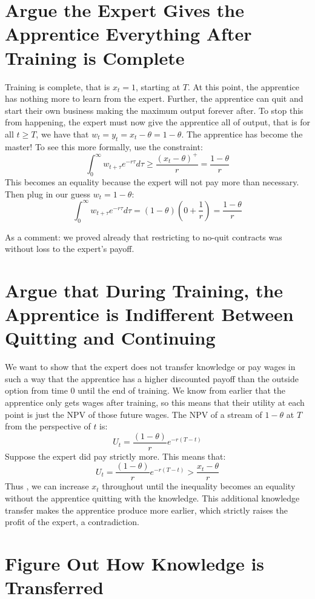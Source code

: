 \documentclass{article}
\begin{document}
\section{Argue the Expert Gives the Apprentice Everything After Training is Complete}

Training is complete, that is $x_t=1$, starting at $T$. At this point, the apprentice has nothing more to learn from the expert. Further, the apprentice can quit and start their own business making the maximum output forever after. To stop this from happening, the expert must now give the apprentice all of output, that is for all $t\geq T$, we have that $w_t=y_t=x_t-\theta=1-\theta$. The apprentice has become the master! To see this more formally, use the constraint:
\[ \int_0^\infty w_{t+\tau} e^{-r\tau}d\tau \geq \frac{(x_t-\theta)^+}{r}=\frac{1-\theta}{r}  \]
This becomes an equality because the expert will not pay more than necessary. Then plug in our guess $w_t=1-\theta$:
\[ \int_0^\infty w_{t+\tau} e^{-r\tau}d\tau = (1-\theta)(0+\frac{1}{r})=\frac{1-\theta}{r} \]

As a comment: we proved already that restricting to no-quit contracts was without loss to the expert's payoff.

\section{Argue that During Training, the Apprentice is Indifferent Between Quitting and Continuing}

We want to show that the expert does not transfer knowledge or pay wages in such a way that the apprentice has a higher discounted payoff than the outside option from time $0$ until the end of training.  We know from earlier that the apprentice only gets wages after training, so this means that their utility at each point is just the NPV of those future wages. The NPV of a stream of $1-\theta$ at $T$ from the perspective of $t$ is:
\[U_t= \frac{(1-\theta)}{r}e^{-r(T-t)}\]
Suppose the expert did pay strictly more. This means that:
\[U_t= \frac{(1-\theta)}{r}e^{-r(T-t)} > \frac{x_t-\theta}{r}  \]
Thus , we can increase $x_t$ throughout until the inequality becomes an equality without the apprentice quitting with the knowledge. This additional knowledge transfer makes the apprentice produce more earlier, which strictly raises the profit of the expert, a contradiction.

\section{Figure Out How Knowledge is Transferred}
\end{document}
